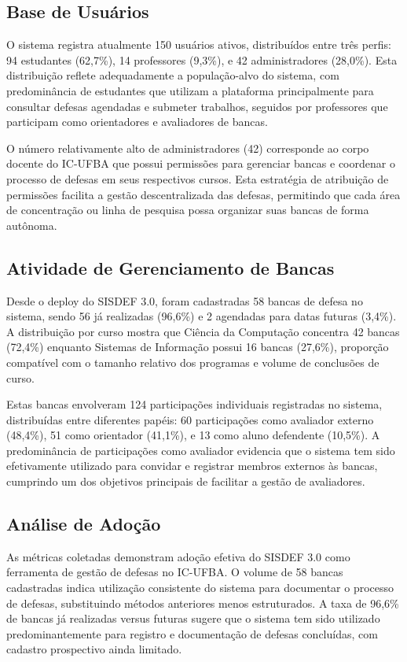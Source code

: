 \documentclass[nonacm, sigconf]{acmart}
\begin{document}
\subsection{Base de Usuários}

O sistema registra atualmente 150 usuários ativos, distribuídos entre três perfis: 94 estudantes (62,7\%), 14 professores (9,3\%), e 42 administradores (28,0\%). Esta distribuição reflete adequadamente a população-alvo do sistema, com predominância de estudantes que utilizam a plataforma principalmente para consultar defesas agendadas e submeter trabalhos, seguidos por professores que participam como orientadores e avaliadores de bancas.

O número relativamente alto de administradores (42) corresponde ao corpo docente do IC-UFBA que possui permissões para gerenciar bancas e coordenar o processo de defesas em seus respectivos cursos. Esta estratégia de atribuição de permissões facilita a gestão descentralizada das defesas, permitindo que cada área de concentração ou linha de pesquisa possa organizar suas bancas de forma autônoma.

\subsection{Atividade de Gerenciamento de Bancas}

Desde o deploy do SISDEF 3.0, foram cadastradas 58 bancas de defesa no sistema, sendo 56 já realizadas (96,6\%) e 2 agendadas para datas futuras (3,4\%). A distribuição por curso mostra que Ciência da Computação concentra 42 bancas (72,4\%) enquanto Sistemas de Informação possui 16 bancas (27,6\%), proporção compatível com o tamanho relativo dos programas e volume de conclusões de curso.

Estas bancas envolveram 124 participações individuais registradas no sistema, distribuídas entre diferentes papéis: 60 participações como avaliador externo (48,4\%), 51 como orientador (41,1\%), e 13 como aluno defendente (10,5\%). A predominância de participações como avaliador evidencia que o sistema tem sido efetivamente utilizado para convidar e registrar membros externos às bancas, cumprindo um dos objetivos principais de facilitar a gestão de avaliadores.

\subsection{Análise de Adoção}

As métricas coletadas demonstram adoção efetiva do SISDEF 3.0 como ferramenta de gestão de defesas no IC-UFBA. O volume de 58 bancas cadastradas indica utilização consistente do sistema para documentar o processo de defesas, substituindo métodos anteriores menos estruturados. A taxa de 96,6\% de bancas já realizadas versus futuras sugere que o sistema tem sido utilizado predominantemente para registro e documentação de defesas concluídas, com cadastro prospectivo ainda limitado.
\end{document}
